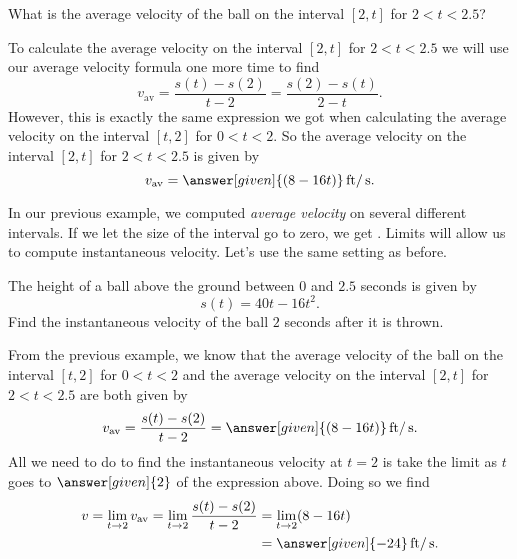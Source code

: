 \documentclass{ximera}
\begin{document}
\begin{example}
\begin{explanation}
\end{explanation}

What is the average velocity of the ball on the interval $[2,t]$ for
$2<t<2.5$?

\begin{explanation}

To calculate the average velocity on the interval $[2,t]$ for 
$2<t<2.5$ we will use our average velocity formula one more time
to find
\[
v_{\text{av}} = \frac{s(t)-s(2)}{t-2} = \frac{s(2)-s(t)}{2-t}. 
\]
However, this is exactly the same expression we got when calculating
the average velocity on the interval $[t,2]$ for $0<t<2$.  So the 
average velocity on the interval $[2,t]$ for $2<t<2.5$ is given by
\[
v_{\text{av}} =\answer[given]{(8-16t)}\unit{ft}/\unit{s}.
\]
\end{explanation}
\end{example}

In our previous example, we computed \textit{average velocity} on
several different intervals. If we let the size of the interval go to
zero, we get . Limits will allow us to
compute instantaneous velocity.  Let's use the same setting as before.

\begin{example}
The height of a ball above the ground between $0$ and $2.5$ seconds
is given by
\[
s(t) = 40t - 16t^2.
\] 
Find the instantaneous velocity of the ball $2$ seconds after it
is thrown.
\begin{explanation}
From the previous example, we know that the average velocity of the
ball on the interval $[t,2]$ for $0<t<2$ and the average velocity
on the interval $[2,t]$ for $2<t<2.5$ are both given by
\[
v_{\text{av}} =  \frac{s(t)-s(2)}{t-2}= \answer[given]{(8-16t)}\unit{ft}/\unit{s}.
\]
All we need to do to find the instantaneous velocity at $t=2$ is 
take the limit as $t$ goes to $\answer[given]{2}$ of the expression
above.  Doing so we find
\begin{align*}
v = \lim_{t\to2}v_{\text{av}}
=\lim_{t\to2}  \frac{s(t)-s(2)}{t-2}
&= \lim_{t\to2}(8-16t)\\
&= \answer[given]{-24}\unit{ft}/\unit{s}.
\end{align*}
\end{explanation}
\end{example}
\end{document}

